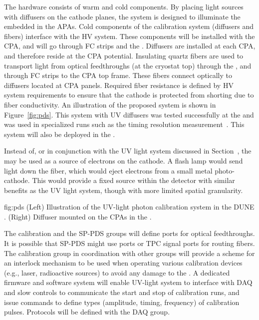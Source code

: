 The hardware consists of warm and cold components. By placing light sources with diffusers on the cathode planes, the system is designed to illuminate the  embedded in the %
APAs.  Cold components of the calibration system (diffusers and fibers) interface with the HV system. These components will be installed with the %
CPA, and will 
go through FC strips and the . %
Diffusers are installed at each CPA, and therefore reside at the %
CPA potential. Insulating quartz fibers are %
used to transport light from optical feedthroughs (at the cryostat top) through the , %
and through FC strips to the CPA top frame. These fibers connect optically %
to diffusers located at CPA panels. Required fiber resistance is defined by HV system requirements to ensure that the cathode is protected from shorting due to fiber conductivity. An illustration of the proposed system is shown in Figure~\ref{fig:pds}. This system with UV diffusers was tested successfully at the %
 and was used in specialized runs such as the timing resolution measurement~\cite{Adams:2018lfb}. This system will also be deployed in the .   

Instead of, or in conjunction with the UV light system discussed in Section~\cite{sec:laser}, the  may be used as a source of electrons on the cathode. A flash lamp would send light down the fiber, which would eject electrons from a small metal photo-cathode. This would provide a fixed source within the detector with similar benefits as the UV light system, though with more limited spatial granularity. 


\begin{dunefigure}{fig:pds}
{(Left) Illustration of the UV-light photon calibration system in the DUNE . (Right) Diffuser mounted on the CPAs in the .}
\end{dunefigure}

The calibration and the SP-PDS groups will define ports for optical feedthroughs. It is possible that SP-PDS might use  ports or TPC signal ports for routing fibers. The calibration group in coordination with other groups will provide a scheme for %
an interlock mechanism to be used when operating various calibration devices (e.g., laser, radioactive sources) to avoid any damage to the . A dedicated firmware and software system will enable UV-light system to interface with DAQ and slow controls to communicate the start and stop of calibration runs, and issue commands to define types (amplitude, timing, frequency) of calibration pulses. Protocols will be defined with the DAQ group. 

